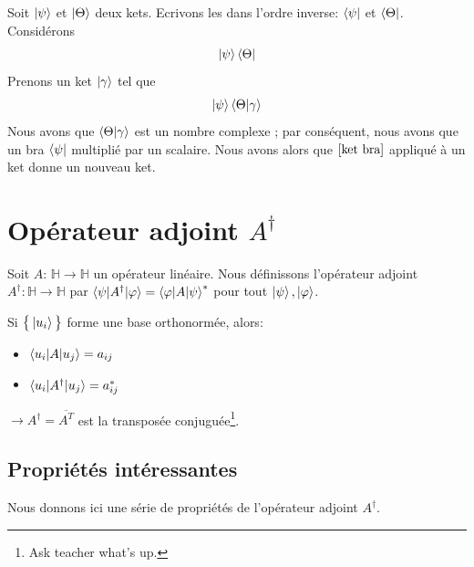 \documentclass[../notesdecours.tex]{subfiles}
\begin{document}
\begin{exemple} 
Soit $\ket{\psi}$ et $\ket{\Theta}$ deux kets. Ecrivons les dans l'ordre inverse: $\bra{\psi}$ et $\bra{\Theta}$. Considérons 
\begin{equation}
\ket{\psi}\bra{\Theta}
\label{ket bra}
\end{equation}
Prenons un ket $\ket{\gamma}$ tel que
\begin{equation}
\ket{\psi}\braket{\Theta|\gamma}
\end{equation}
Nous avons que $\braket{\Theta|\gamma}$ est un nombre complexe ; par conséquent, nous avons que un bra $\bra{\psi}$ multiplié par un scalaire. Nous avons alors que $\eqref{ket bra}$ appliqué à un ket donne un nouveau ket.
\end{exemple}

\section{Opérateur adjoint $A^\dag$}
\begin{definition} Soit $A$: $\mathbb{H} \rightarrow \mathbb{H}$ un opérateur linéaire. Nous définissons l'opérateur adjoint $A^\dag : \mathbb{H} \rightarrow \mathbb{H}$ par $\braket{\psi|A^\dag|\varphi} = \braket{\varphi|A|\psi}^*$ pour tout $\ket{\psi},\ket{\varphi}$. \end{definition}

Si $\big\{\ket{u_i}\big\}$ forme une base orthonormée, alors:
\begin{itemize}
\item $\braket{u_i|A|u_j} = a_{ij}$
\item $\braket{u_i|A^\dag|u_j} = a^*_{ij}$
\end{itemize}
$\rightarrow A^\dag = \overline{A^T}$ est la transposée conjuguée\footnote{Ask teacher what's up.}.\\
\subsection{Propriétés intéressantes}
Nous donnons ici une série de propriétés de l'opérateur adjoint $A^\dag$.
\begin{center}
\end{center}
\end{document}
